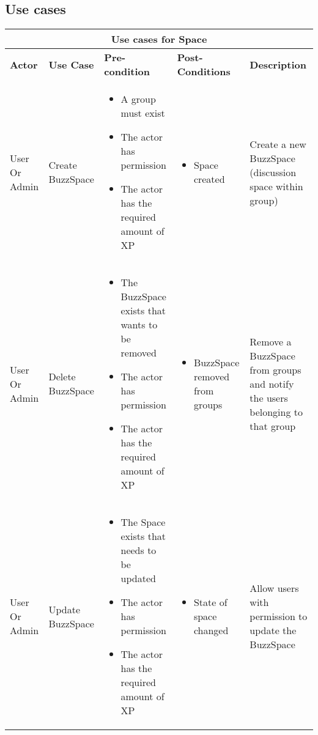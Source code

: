 	\subsection{Use cases}
	\newpage
	\begin{longtable}{@{}|p{1.5cm}|p{2.2cm}|p{3cm}|p{3.5cm}|p{3.5cm}|@{}}
		\toprule
		\multicolumn{5}{|c|}{\textbf{Use cases for Space}}\\
		\hline
		\textbf{Actor} & \textbf{Use Case} & \textbf{Pre-condition} & \textbf{Post-Conditions} & \textbf{Description} \\ \midrule
		
		User Or Admin& 
		Create BuzzSpace& 
		\begin{itemize}
			\item A group must exist
			\item The actor has permission
			\item The actor has the required amount of XP
		\end{itemize}& 
		\begin{itemize}
			\item Space created
		\end{itemize} & 
		Create a new BuzzSpace (discussion space within group) \\ \midrule
		
		User Or Admin& 
		Delete BuzzSpace& 
		\begin{itemize}
			\item The BuzzSpace exists that wants to be removed
			\item The actor has permission
			\item The actor has the required amount of XP
		\end{itemize}& 
		\begin{itemize}
			\item BuzzSpace removed from groups
		\end{itemize} & 
		Remove a BuzzSpace from groups and notify the users belonging to that group \\ \midrule
		
		User Or Admin& 
		Update BuzzSpace& 
		\begin{itemize}
			\item The Space exists that needs to be updated
			\item The actor has permission
			\item The actor has the required amount of XP
		\end{itemize}& 
		\begin{itemize}
			\item State of space changed
		\end{itemize} & 
		Allow users with permission to update the BuzzSpace \\ \midrule
		

\end{longtable}
